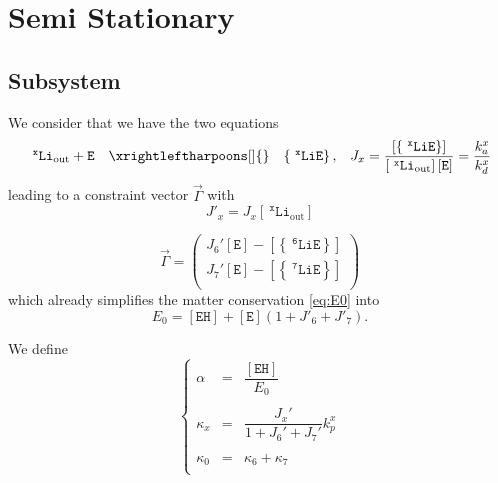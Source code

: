 \documentclass[aps,onecolumn,11pt]{revtex4}
\newcommand{\mychem}[1]{\mathtt{#1}}
\newcommand{\myconc}[1]{\left\lbrack{#1}\right\rbrack}
\newcommand{\spLi}[1]{{~^{\mychem{#1}}\mychem{Li}}}
\newcommand{\Li}[1]{\myconc{\spLi{#1}}}
\newcommand{\spEout}{\mychem{E}}
\newcommand{\Eout}{\myconc{\spEout}}
\newcommand{\spLiE}[1]{\left\lbrace\spLi{#1}\spEout\right\rbrace}
\newcommand{\LiE}[1]{\myconc{\spLiE{#1}}}
\newcommand{\spLiOut}[1]{{\spLi{#1}}_{\mathrm{out}}}
\newcommand{\LiOut}[1]{\myconc{\spLiOut{#1}}}
\newcommand{\spEHin}{\mychem{EH}}
\newcommand{\EHin}{\myconc{\spEHin}}
\newcommand{\mymat}[1]{{\bm{#1}}}
\begin{document}
\section{Semi Stationary}
\subsection{Subsystem}
We consider that we have the two equations
\begin{equation}
	\begin{array}{rcll}
	 \spLiOut{x} +  \spEout &  \xrightleftharpoons[]{} & \spLiE{x}, & J_x = \dfrac{\LiE{x}}{\LiOut{x} \Eout} = \dfrac{k_a^x}{k_d^x}\\
	 \end{array}
\end{equation}
leading to a constraint vector $\vec{\Gamma}$
with 
\begin{equation}
	J'_x = J_x \LiOut{x}
\end{equation}

\begin{equation}
\vec{\Gamma} = 
\begin{pmatrix}
	J_6' \Eout - \LiE{6} \\
	J_7' \Eout - \LiE{7} \\
\end{pmatrix}
\end{equation}
which already simplifies the matter conservation \eqref{eq:E0} into
\begin{equation}
	E_0 = \EHin + \Eout \left(1+J'_6+J'_7\right).
\end{equation}


We define
\begin{equation}
\left\lbrace
	\begin{array}{rcl}
		\alpha & = & \dfrac{\EHin}{E_0}\\
		\\
		\kappa_x & = & \dfrac{J_x'}{1+J_6'+J_7'} k_p^x\\
		\\
		\kappa_0 & = & \kappa_6 + \kappa_7\\
	\end{array}
\right.
\end{equation}
\end{document}
